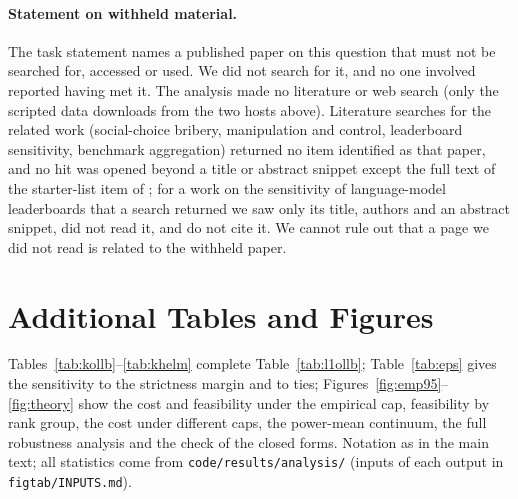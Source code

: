 \paragraph{Statement on withheld material.}
The task statement names a published paper on this question that must not be searched for, accessed or used. We did not search for it, and no one involved reported having met it. The analysis made no literature or web search (only the scripted data downloads from the two hosts above). Literature searches for the related work (social-choice bribery, manipulation and control, leaderboard sensitivity, benchmark aggregation) returned no item identified as that paper, and no hit was opened beyond a title or abstract snippet except the full text of the starter-list item of \citet{chen2026incentives}; for a work on the sensitivity of language-model leaderboards that a search returned we saw only its title, authors and an abstract snippet, did not read it, and do not cite it. We cannot rule out that a page we did not read is related to the withheld paper.

\section{Additional Tables and Figures}
\label{app:tables}

Tables~\ref{tab:kollb}--\ref{tab:khelm} complete Table~\ref{tab:l1ollb}; Table~\ref{tab:eps} gives the sensitivity to the strictness margin and to ties; Figures~\ref{fig:emp95}--\ref{fig:theory} show the cost and feasibility under the empirical cap, feasibility by rank group, the cost under different caps, the power-mean continuum, the full robustness analysis and the check of the closed forms. Notation as in the main text; all statistics come from \texttt{code/results/analysis/} (inputs of each output in \texttt{figtab/INPUTS.md}).

\begin{table}[h]
\centering\small
\caption{Median tasks touched $K$ [95\% bootstrap interval] over the feasible targets, Open LLM Leaderboard (notation of Table~\ref{tab:l1ollb}, including ``feas.'' and $^\dagger$).}
\label{tab:kollb}
\resizebox{\linewidth}{!}{}
\end{table}

\begin{table}[h]
\centering\small
\caption{Median total points $\LL$ [95\% bootstrap interval] over the feasible targets, HELM MMLU v1.13.0 (79 models, 57 subjects; all rules on every non-leading target; notation of Table~\ref{tab:l1ollb}).}
\label{tab:l1helm}
\resizebox{\linewidth}{!}{}
\end{table}

